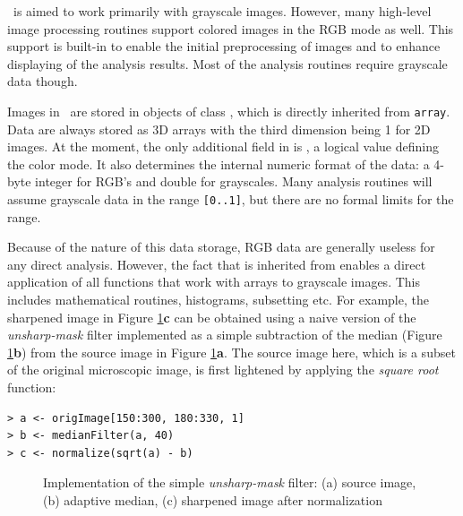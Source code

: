 \EBImage\ is aimed to work primarily with grayscale images. However, many high-level image processing routines support colored images in the RGB mode as well. This support is built-in to enable the initial preprocessing of images and to enhance displaying of the analysis results. Most of the analysis routines require grayscale data though.

Images in \EBImage\ are stored in objects of class , which is directly inherited from {\tt array}. Data are always stored as 3D arrays with the third dimension being 1 for 2D images. At the moment, the only additional field in  is , a logical value defining the color mode. It also determines the internal numeric format of the data: a 4-byte integer for RGB's and double for grayscales. Many analysis routines will assume grayscale data in the range {\tt [0..1]}, but there are no formal limits for the range.

Because of the nature of this data storage, RGB data are generally useless for any direct analysis. However, the fact that  is inherited from  enables a direct application of all \R{} functions that work with arrays to grayscale images. This includes mathematical routines, histograms, subsetting etc. For example, the sharpened image in Figure \ref{figure:sharpening}{\bf c} can be obtained using a naive version of the {\em unsharp-mask} filter implemented as a simple subtraction of the median (Figure \ref{figure:sharpening}{\bf b}) from the source image in Figure \ref{figure:sharpening}{\bf a}. The source image here, which is a subset of the original microscopic image, is first lightened by applying the {\em square root} function:

\begin{verbatim}
> a <- origImage[150:300, 180:330, 1]
> b <- medianFilter(a, 40)
> c <- normalize(sqrt(a) - b)
\end{verbatim}

\begin{figure}
\vspace*{.1in}
\begin{center}
\end{center}
\caption{\label{figure:sharpening}
    Implementation of the simple {\em unsharp-mask} filter: (a) source image, (b) adaptive median, (c) sharpened image after normalization
}
\end{figure}

